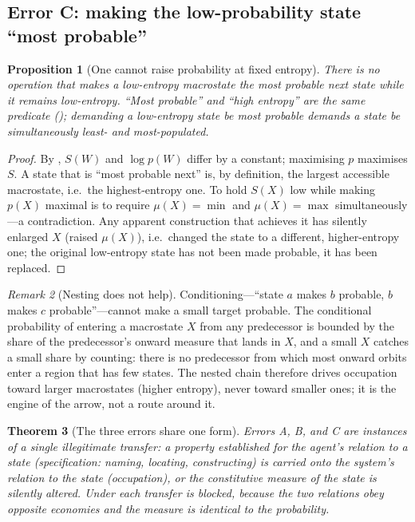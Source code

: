 \documentclass[11pt,a4paper]{article}
\theoremstyle{thmstyle}
\newtheorem{theorem}{Theorem}[section]
\newtheorem{proposition}[theorem]{Proposition}
\theoremstyle{definition}
\theoremstyle{remark}
\newtheorem{remark}[theorem]{Remark}
\newcommand{\Wmac}{W}
\begin{document}
\subsection{Error C: making the low-probability state ``most probable''}

\begin{proposition}[One cannot raise probability at fixed entropy]
\label{prop:err-prob}
There is no operation that makes a low-entropy macrostate the most probable next
state while it remains low-entropy. ``Most probable'' and ``high entropy'' are
the same predicate (); demanding a low-entropy state be
most probable demands a state be simultaneously least- and most-populated.
\end{proposition}

\begin{proof}
By , $S(\Wmac)$ and $\log p(\Wmac)$ differ by a
constant; maximising $p$ maximises $S$. A state that is ``most probable next''
is, by definition, the largest accessible macrostate, i.e.\ the highest-entropy
one. To hold $S(X)$ low while making $p(X)$ maximal is to require
$\mu(X)=\min$ and $\mu(X)=\max$ simultaneously---a contradiction. Any apparent
construction that achieves it has silently enlarged $X$ (raised $\mu(X)$), i.e.\
changed the state to a different, higher-entropy one; the original low-entropy
state has not been made probable, it has been replaced.
\end{proof}

\begin{remark}[Nesting does not help]
\label{rem:nesting}
Conditioning---``state $a$ makes $b$ probable, $b$ makes $c$ probable''---cannot
make a small target probable. The conditional probability of entering a macrostate
$X$ from any predecessor is bounded by the share of the predecessor's onward
measure that lands in $X$, and a small $X$ catches a small share by counting:
there is no predecessor from which most onward orbits enter a region that has few
states. The nested chain therefore drives occupation toward larger macrostates
(higher entropy), never toward smaller ones; it is the engine of the arrow, not a
route around it.
\end{remark}

\begin{theorem}[The three errors share one form]
\label{thm:one-form}
Errors A, B, and C are instances of a single illegitimate transfer: a property
established for the agent's relation to a state (specification: naming, locating,
constructing) is carried onto the system's relation to the state (occupation), or
the constitutive measure of the state is silently altered. Under
\Cref{prin:asym} each transfer is blocked, because the two relations obey
opposite economies and the measure is identical to the probability.
\end{theorem}
\end{document}
